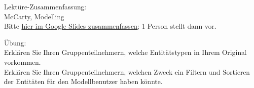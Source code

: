 \begin{frame}[standout]
    \alert{Lektüre}-Zusammenfassung: \\
    McCarty, Modelling \\[1em]
    {\footnotesize Bitte \alert{\href{https://docs.google.com/presentation/d/1v_j9Jms21hZokX9hLJ_7kcnV63FJPHTHNowfLVLiYys/edit?usp=sharing}{hier im Google Slides zusammenfassen}}; 1 Person stellt dann vor. \\
    }
\end{frame}


\begin{frame}[standout]
    \alert{Übung:} \\ \small Erklären Sie Ihren Gruppenteilnehmern, welche Entitätstypen in Ihrem Original vorkommen. \\
    Erklären Sie Ihren Gruppenteilnehmern, welchen Zweck ein Filtern und Sortieren der Entitäten für den Modellbenutzer haben könnte.
\end{frame}

